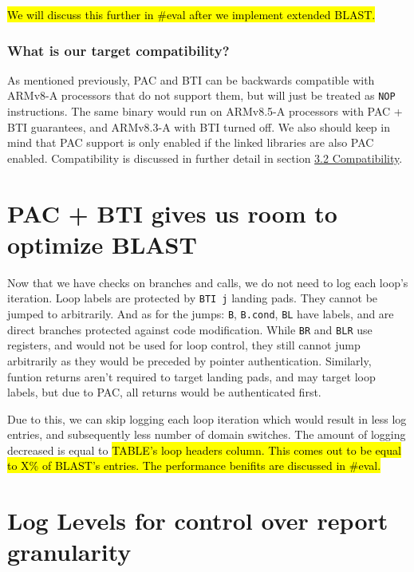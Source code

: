 \documentclass[a4paper, nobind]{templates/ociamthesis}
\begin{document}
\hl{We will discuss this further in \#eval after we implement extended BLAST.}

\subsubsection{What is our target compatibility?}\label{what-is-our-target-compatibility}

As mentioned previously, PAC and BTI can be backwards compatible with ARMv8-A processors
that do not support them, but will just be treated as \texttt{NOP} instructions.
The same binary would run on ARMv8.5-A processors with PAC + BTI guarantees, and
ARMv8.3-A with BTI turned off.
We also should keep in mind that PAC support is only enabled if the linked libraries
are also PAC enabled.
Compatibility is discussed in further detail in section \hyperref[compatibility]{3.2 Compatibility}.

\section{PAC + BTI gives us room to optimize BLAST}\label{optimizing-blast}

Now that we have checks on branches and calls, we do not need to log each loop's iteration.
Loop labels are protected by \texttt{BTI\ j} landing pads. They cannot be jumped to arbitrarily.
And as for the jumps: \texttt{B}, \texttt{B.cond}, \texttt{BL} have labels, and are direct branches protected
against code modification.
While \texttt{BR} and \texttt{BLR} use registers, and would not be used for loop control,
they still cannot jump arbitrarily as they would be preceded by pointer authentication.
Similarly, funtion returns aren't required to target landing pads, and may target loop labels,
but due to PAC, all returns would be authenticated first.

Due to this, we can skip logging each loop iteration which would result in less
log entries, and subsequently less number of domain switches. The amount of logging
decreased is equal to \hl{TABLE's loop headers column. This comes out to be
equal to X\% of BLAST's entries. The performance benifits are discussed in \#eval.}

\section{Log Levels for control over report granularity}\label{log-levels-for-control-over-report-granularity}
\end{document}
